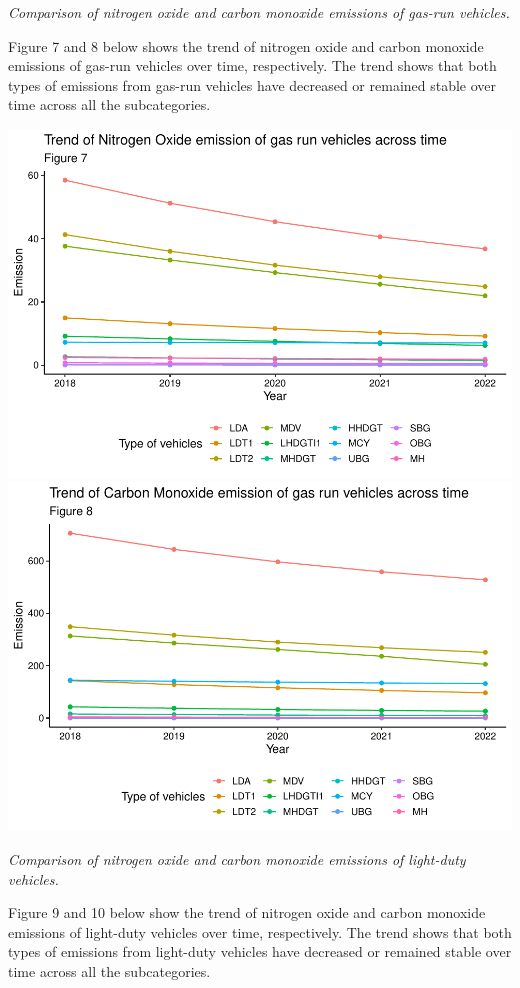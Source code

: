 \documentclass[
  12pt,
]{article}
\begin{document}
\emph{Comparison of nitrogen oxide and carbon monoxide emissions of
gas-run vehicles.}

Figure 7 and 8 below shows the trend of nitrogen oxide and carbon
monoxide emissions of gas-run vehicles over time, respectively. The
trend shows that both types of emissions from gas-run vehicles have
decreased or remained stable over time across all the subcategories.

\includegraphics{Code_Main-Markdown_files/figure-latex/unnamed-chunk-6-1.pdf}
\includegraphics{Code_Main-Markdown_files/figure-latex/unnamed-chunk-6-2.pdf}

\emph{Comparison of nitrogen oxide and carbon monoxide emissions of
light-duty vehicles.}

Figure 9 and 10 below show the trend of nitrogen oxide and carbon
monoxide emissions of light-duty vehicles over time, respectively. The
trend shows that both types of emissions from light-duty vehicles have
decreased or remained stable over time across all the subcategories.
\end{document}
